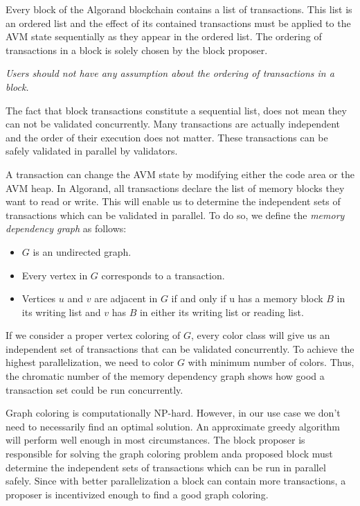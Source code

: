 \documentclass[11pt, A4]{article}
\begin{document}
    Every block of the Algorand blockchain contains a list of transactions. This list is an ordered list and the
    effect of its contained transactions must be applied to the AVM state sequentially as they appear in the ordered
    list. The ordering of transactions in a block is solely chosen by the block proposer.

    \emph{Users should not have any assumption about the ordering of transactions in a block.}

    The fact that block transactions constitute a sequential list, does not mean they can not be validated
    concurrently. Many transactions are actually independent and the order of their execution does not matter. These
    transactions can be safely validated in parallel by validators.

    A transaction can change the AVM state by modifying either the code area or the AVM heap. In Algorand, all
    transactions declare the list of memory blocks they want to read or write. This will enable us to determine the
    independent sets of transactions which can be validated in parallel. To do so, we define the \emph{memory dependency
    graph} as follows:

    \begin{itemize}
        \item \(G\) is an undirected graph.
        \item Every vertex in \(G\) corresponds to a transaction.
        \item Vertices \(u\) and \(v\) are adjacent in \(G\) if and only if u has a memory block \(B\) in its writing
        list and \(v\) has \(B\) in either its writing list or reading list.
    \end{itemize}

    If we consider a proper vertex coloring of \(G\), every color class will give us an independent set of
    transactions that can be validated concurrently. To achieve the highest parallelization, we need to color \(G\)
    with minimum number of colors. Thus, the chromatic number of the memory dependency graph shows how good a
    transaction set could be run concurrently.

    Graph coloring is computationally NP-hard. However, in our use case we don't need to necessarily find an optimal
    solution. An approximate greedy algorithm will perform well enough in most circumstances. The block proposer is
    responsible for solving the graph coloring problem anda proposed block must determine the independent sets of
    transactions which can be run in parallel safely. Since with better parallelization a block can contain more
    transactions, a proposer is incentivized enough to find a good graph coloring.
\end{document}

